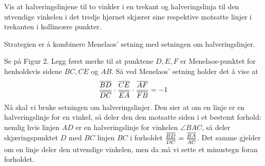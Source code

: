 \documentclass[11pt, norsk]{article}
\begin{document}
\begin{oppg}
Vis at halveringslinjene til to vinkler i en trekant og halveringslinja til den utvendige vinkelen i det tredje hjørnet skjærer sine respektive motsatte linjer i trekanten i kollineære punkter.
\end{oppg}
\begin{losn}
Strategien er å kombinere Menelaos' setning med setningen om halveringslinjer.

Se på Figur 2. Legg først merke til at punktene $D,E,F$ er Menelaos-punktet for henholdsvis sidene $BC,CE$ og $AB$. Så ved Menelaos' setning holder det å vise at 
$$
\frac{\overline{BD}}{\overline{DC}} \cdot
\frac{\overline{CE}}{\overline{EA}} \cdot
\frac{\overline{AF}}{\overline{FB}}  = -1
$$
Nå skal vi bruke setningen om halveringslinjer. Den sier at om en linje er en halveringslinje for en vinkel, så deler den den motsatte siden i et bestemt forhold: nemlig hvis linjen $AD$ er en halveringslinje for vinkelen $\angle BAC$, så deler skjæringspunktet $D$ med $BC$ linjen $BC$ i forholdet $\frac{\overline{BD}}{\overline{DC}}=\frac{\overline{BA}}{\overline{AC}}$. Det samme gjelder om en linje deler den utvendige vinkelen, men da må vi sette et minustegn foran forholdet.


\end{losn}
\end{document}
